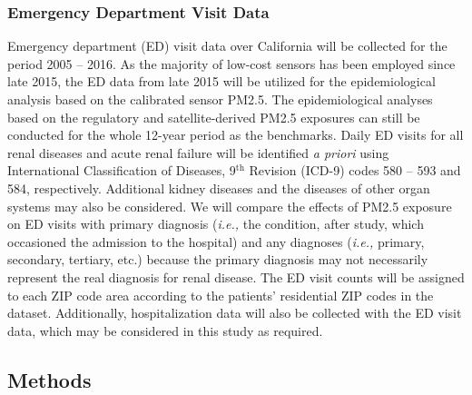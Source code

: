 \documentclass[11pt]{article}
\begin{document}
\subsubsection{Emergency Department Visit Data}
Emergency department (ED) visit data over California will be collected for the period 2005 -- 2016. As the majority of low-cost sensors has been employed since late 2015, the ED data from late 2015 will be utilized for the epidemiological analysis based on the calibrated sensor PM2.5. The epidemiological analyses based on the regulatory and satellite-derived PM2.5 exposures can still be conducted for the whole 12-year period as the benchmarks. Daily ED visits for all renal diseases and acute renal failure will be identified \textit{a priori} using International Classification of Diseases, 9$\mathrm{^{th}}$ Revision (ICD-9) codes 580 -- 593 and 584, respectively. Additional kidney diseases and the diseases of other organ systems may also be considered. We will compare the effects of PM2.5 exposure on ED visits with primary diagnosis (\textit{i.e.,} the condition, after study, which occasioned the admission to the hospital) and any diagnoses (\textit{i.e.,} primary, secondary, tertiary, etc.) because the primary diagnosis may not necessarily represent the real diagnosis for renal disease. The ED visit counts will be assigned to each ZIP code area according to the patients' residential ZIP codes in the dataset. Additionally, hospitalization data will also be collected with the ED visit data, which may be considered in this study as required. 

\subsection{Methods}
\end{document}

